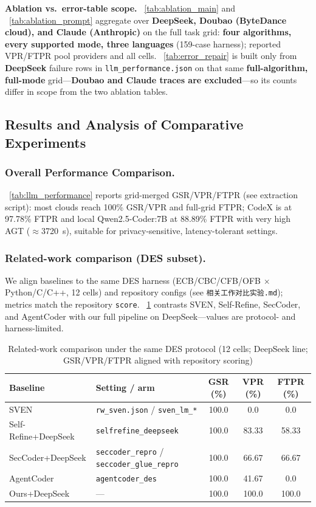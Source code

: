 \documentclass[12pt]{llncs}
\begin{document}
\textbf{Ablation vs.\ error-table scope.} \tablename~\ref{tab:ablation_main} and \tablename~\ref{tab:ablation_prompt} aggregate over \textbf{DeepSeek, Doubao (ByteDance cloud), and Claude (Anthropic)} on the full task grid: \textbf{four algorithms, every supported mode, three languages} (159-case harness); reported VPR/FTPR pool providers and all cells. \tablename~\ref{tab:error_repair} is built only from \textbf{DeepSeek} failure rows in \texttt{llm\_performance.json} on that same \textbf{full-algorithm, full-mode} grid---\textbf{Doubao and Claude traces are excluded}---so its counts differ in scope from the two ablation tables.

\subsection{Results and Analysis of Comparative Experiments}
\subsubsection{Overall Performance Comparison.}
\tablename~\ref{tab:llm_performance} reports grid-merged GSR/VPR/FTPR (see extraction script): most clouds reach 100\% GSR/VPR and full-grid FTPR; CodeX is at 97.78\% FTPR and local Qwen2.5-Coder:7B at 88.89\% FTPR with very high AGT ($\approx$3720~s), suitable for privacy-sensitive, latency-tolerant settings.

\subsubsection{Related-work comparison (DES subset).}
We align baselines to the same DES harness (ECB/CBC/CFB/OFB $\times$ Python/C/C++, 12 cells) and repository configs (see \texttt{相关工作对比实验.md}); metrics match the repository \texttt{score}. \tablename~\ref{tab:rw_same_protocol_des} contrasts SVEN, Self-Refine, SecCoder, and AgentCoder with our full pipeline on DeepSeek---values are protocol- and harness-limited.

\begin{table}[H]
  \centering
  \footnotesize
  \caption{Related-work comparison under the same DES protocol (12 cells; DeepSeek line; GSR/VPR/FTPR aligned with repository scoring)}
  \label{tab:rw_same_protocol_des}
  \setlength{\tabcolsep}{4pt}
  \begin{tabular}{p{} p{} c c c}
    \toprule
    Baseline & Setting / arm & GSR (\%) & VPR (\%) & FTPR (\%) \\
    \midrule
    SVEN & \texttt{rw\_sven.json} / \texttt{sven\_lm\_*} & 100.0 & 0.0 & 0.0 \\
    Self-Refine+DeepSeek & \texttt{selfrefine\_deepseek} & 100.0 & 83.33 & 58.33 \\
    SecCoder+DeepSeek & \texttt{seccoder\_repro} / \texttt{seccoder\_glue\_repro} & 100.0 & 66.67 & 66.67 \\
    AgentCoder & \texttt{agentcoder\_des} & 100.0 & 41.67 & 0.0 \\
    Ours+DeepSeek & --- & 100.0 & 100.0 & 100.0 \\
    \bottomrule
  \end{tabular}
\end{table}
\end{document}
